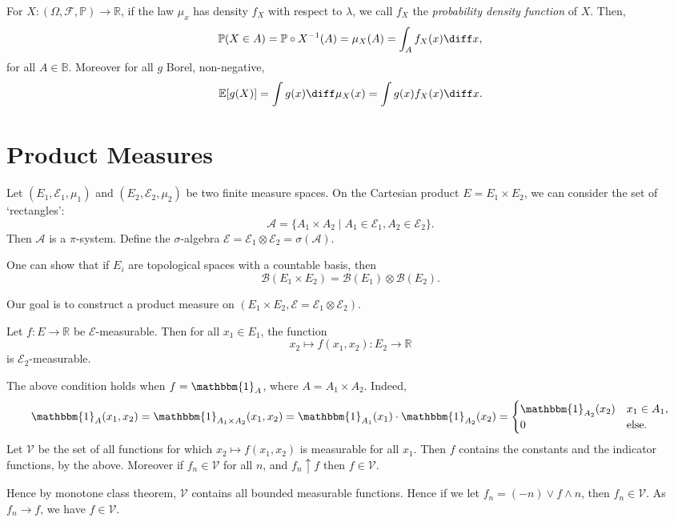 \documentclass[12pt]{article}
\begin{document}
For $X : (\Omega, \mathcal{F}, \mathbb{P}) \to \mathbb{R}$, if the law $\mu_x$ has density $f_X$ with respect to $\lambda$, we call $f_X$ the \emph{probability density function} of $X$. Then,
\[
\mathbb{P}(X \in A) = \mathbb{P} \circ X^{-1}(A) = \mu_X(A) = \int_A f_X(x) \diff x,
\]
for all $A \in \mathbb{B}$. Moreover for all $g$ Borel, non-negative,
\[
\mathbb{E}[g(X)] = \int g(x) \diff \mu_X(x) = \int g(x) f_X(x) \diff x.
\]

\newpage

\section{Product Measures}
\label{sec:prod_meas}

Let $(E_1, \mathcal{E}_1, \mu_1)$ and $(E_2, \mathcal{E}_2, \mu_2)$ be two finite measure spaces. On the Cartesian product $E = E_1 \times E_2$, we can consider the set of `rectangles':
\[
	\mathcal{A} = \{A_1 \times A_2 \mid A_1 \in \mathcal{E}_1, A_2 \in \mathcal{E}_2\}.
\]
Then $\mathcal{A}$ is a $\pi$-system. Define the $\sigma$-algebra $\mathcal{E} = \mathcal{E}_1 \otimes \mathcal{E}_2 = \sigma(\mathcal{A})$.

One can show that if $E_i$ are topological spaces with a countable basis, then
\[
	\mathcal{B}(E_1 \times E_2) = \mathcal{B}(E_1) \otimes \mathcal{B}(E_2).
\]

Our goal is to construct a product measure on $(E_1 \times E_2, \mathcal{E} = \mathcal{E}_1 \otimes \mathcal{E}_2)$.


\begin{lemma}
	Let $f : E \to \mathbb{R}$ be $\mathcal{E}$-measurable. Then for all $x_1 \in E_1$, the function
	\[
	x_2 \mapsto f(x_1, x_2) : E_2 \to \mathbb{R}
	\]
	is $\mathcal{E}_2$-measurable.
\end{lemma}

\begin{proofbox}
	The above condition holds when $f = \mathbbm{1}_{A}$, where $A = A_1 \times A_2$. Indeed,
	\[
	\mathbbm{1}_{A}(x_1, x_2) = \mathbbm{1}_{A_1 \times A_2}(x_1, x_2) = \mathbbm{1}_{A_1}(x_1) \cdot \mathbbm{1}_{A_2}(x_2) =
	\begin{cases}
		\mathbbm{1}_{A_2}(x_2) & x_1 \in A_1,\\
		0 & \text{else}.
	\end{cases}
	\]
	Let $\mathcal{V}$ be the set of all functions for which $x_2 \mapsto f(x_1, x_2)$ is measurable for all $x_1$. Then $f$ contains the constants and the indicator functions, by the above. Moreover if $f_n \in \mathcal{V}$ for all $n$, and $f_n \uparrow f$ then $f \in \mathcal{V}$.

	Hence by monotone class theorem, $\mathcal{V}$ contains all bounded measurable functions. Hence if we let $f_n = (-n) \vee f \wedge n$, then $f_n \in \mathcal{V}$. As $f_n \to f$, we have $f \in \mathcal{V}$.
\end{proofbox}
\end{document}
